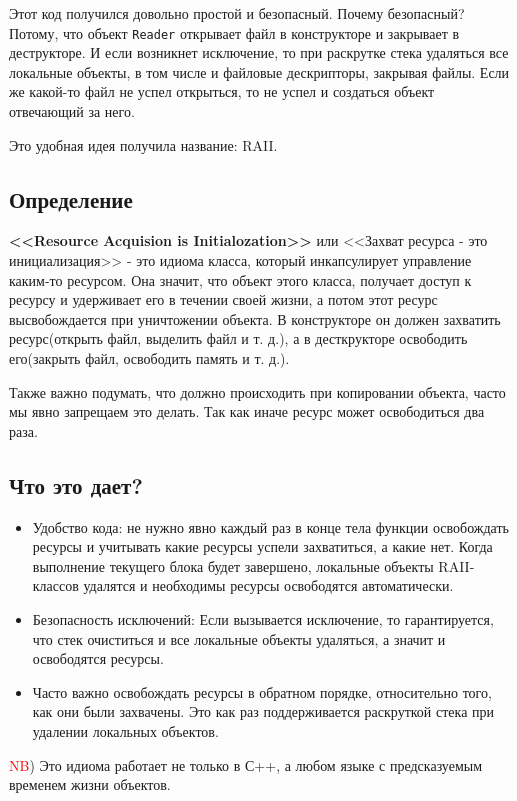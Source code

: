 Этот код получился довольно простой и безопасный. Почему безопасный? Потому, что объект \texttt{Reader} открывает файл в конструкторе и закрывает в деструкторе. И если возникнет исключение, то при раскрутке стека удаляться все локальные объекты, в том числе и файловые дескрипторы, закрывая файлы. Если же какой-то файл не успел открыться, то не успел и создаться объект отвечающий за него.

Это удобная идея получила название: RAII.

\subsection{Определение}

\textbf{<<Resource Acquision is Initialozation>>} или <<Захват ресурса - это инициализация>> - это идиома класса, который инкапсулирует управление каким-то ресурсом. Она значит, что объект этого класса, получает доступ к ресурсу и удерживает его в течении своей жизни, а потом этот ресурс высвобождается при уничтожении объекта.
В конструкторе он должен захватить ресурс(открыть файл, выделить файл и т. д.), а в десткрукторе освободить его(закрыть файл, освободить память и т. д.).

Также важно подумать, что должно происходить при копировании объекта, часто мы явно запрещаем это делать. Так как иначе ресурс может освободиться два раза.

\subsection{Что это дает?}
\begin{itemize}
\item Удобство кода: не нужно явно каждый раз в конце тела функции освобождать ресурсы и учитывать какие ресурсы успели захватиться, а какие нет. Когда выполнение текущего блока будет завершено, локальные объекты RAII-классов удалятся и необходимы ресурсы освободятся автоматически.
\item Безопасность исключений: Если вызывается исключение, то гарантируется, что стек очиститься и все локальные объекты удаляться, а значит и освободятся ресурсы.
\item Часто важно освобождать ресурсы в обратном порядке, относительно того, как они были захвачены. Это как раз поддерживается раскруткой стека при удалении локальных объектов.
\end{itemize}

\textcolor{red}{NB}) Это идиома работает не только в С++, а любом языке с предсказуемым временем жизни объектов.


